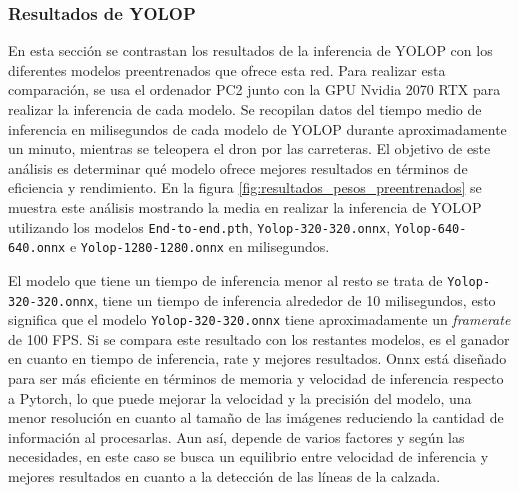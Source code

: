 \subsubsection{Resultados de YOLOP }
\label{sec:resultados}
En esta sección se contrastan los resultados de la inferencia de YOLOP con los diferentes modelos preentrenados que ofrece esta red. Para realizar esta comparación, se usa el ordenador 
PC2 junto con la GPU Nvidia 2070 RTX para realizar la inferencia de cada modelo. Se recopilan datos del tiempo medio de inferencia en milisegundos de cada 
modelo de YOLOP durante aproximadamente
un minuto, mientras se teleopera el dron por las carreteras. El objetivo de este análisis es determinar qué modelo ofrece mejores resultados en términos de eficiencia y rendimiento. 
En la figura \ref{fig:resultados_pesos_preentrenados} se muestra este análisis mostrando la media en realizar la inferencia de YOLOP utilizando los modelos 
\texttt{End-to-end.pth}, \texttt{Yolop-320-320.onnx}, \texttt{Yolop-640-640.onnx} e \texttt{Yolop-1280-1280.onnx} en milisegundos.

El modelo que tiene un tiempo de inferencia menor al resto se trata de \texttt{Yolop-320-320.onnx}, tiene un tiempo de inferencia alrededor de 10 milisegundos, esto
significa que el modelo \texttt{Yolop-320-320.onnx} tiene aproximadamente un \textit{framerate} de 100 FPS. Si se compara este resultado con los restantes modelos, es el ganador en cuanto 
en tiempo de inferencia, rate y mejores resultados. 
Onnx está diseñado para ser más eficiente en términos de memoria y velocidad de inferencia respecto a Pytorch, lo que puede mejorar la velocidad y la precisión
del modelo, una menor resolución en cuanto al tamaño de las imágenes reduciendo la cantidad de información al procesarlas. Aun así, depende de varios factores y según las necesidades, 
en este caso se busca un equilibrio entre velocidad de inferencia y mejores resultados en cuanto a la detección de las líneas de la calzada. 

